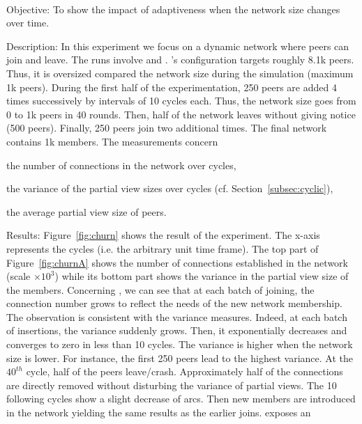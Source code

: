 \ \\

\begin{asparadesc}
\item[Objective:] To show the impact of adaptiveness when the network size
  changes over time.
\item[Description:] In this experiment we focus on a dynamic network where
  peers can join and leave. The runs involve \CYCLON and \SPRAY. \CYCLON's
  configuration targets roughly 8.1k peers. Thus, it is oversized compared the
  network size during the simulation (maximum 1k peers). During the first half
  of the experimentation, 250 peers are added 4 times successively by intervals
  of 10 cycles each. Thus, the network size goes from 0 to 1k peers in 40
  rounds. Then, half of the network leaves without giving notice (500
  peers). Finally, 250 peers join two additional times. The final network
  contains 1k members. The measurements concern
  \begin{inparaenum}
  \item the number of connections in the network over cycles,
  \item the variance of the partial view sizes over cycles
    (cf. Section~\ref{subsec:cyclic}),
  \item the average partial view size of peers.
  \end{inparaenum}
\item[Results:] Figure~\ref{fig:churn} shows the result of the experiment. The
  x-axis represents the cycles (i.e. the arbitrary unit time frame). The top
  part of Figure~\ref{fig:churnA} shows the number of connections established
  in the network (scale $\times 10^3$) while its bottom part shows the variance
  in the partial view size of the members. Concerning \SPRAY, we can see that
  at each batch of joining, the connection number grows to reflect the needs
  of the new network membership. The observation is consistent with the
  variance measures. Indeed, at each batch of insertions, the variance suddenly
  grows. Then, it exponentially decreases and converges to zero in less than 10
  cycles. The variance is higher when the network size is lower. For instance,
  the first 250 peers lead to the highest variance. At the $40^{th}$ cycle,
  half of the peers leave/crash. Approximately half of the connections are directly
  removed without disturbing the variance of partial views. The 10 following
  cycles show a slight decrease of arcs. Then new members are introduced in the
  network yielding the same results as the earlier joins. \CYCLON exposes an

\end{asparadesc}
